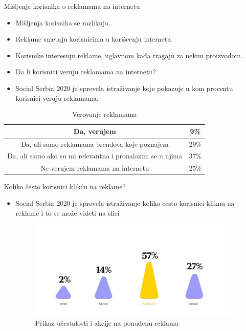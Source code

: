 \documentclass{beamer}
\begin{document}
	\begin{frame}{Mišljenje korisnika o reklamama na internetu}
		\begin{itemize}
			\item Mišljenja korisnika se razlikuju.
			\item Reklame smetaju korisnicima u korišcenju interneta.
			\item Korisnike interesuju reklame, uglavnom kada tragaju za nekim proizvodom.
			\item Da li korisnici veruju reklamama na internetu?
			\item Social Serbia 2020 je sprovela istraživanje koje pokazuje u kom procentu korisnici veruju reklamama.
		\end{itemize}
		\begin{table}[h!]
			\begin{center}
				\caption{Verovanje reklamama}
				\begin{tabular}{|c|c|} \hline
					Da, verujem&9\%\\ \hline
					Da, ali samo reklamama brendova koje poznajem&29\%\\ \hline
					Da, ali samo ako su mi relevantna i pronalazim se u njima&37\%\\ \hline
					Ne verujem reklamama na internetu&25\%\\ \hline
				\end{tabular}
				\label{tab:tabela1}
			\end{center}
		\end{table}
	\end{frame}
	
	
	\begin{frame}{Koliko često korisnici klikću na reklame?}
		
		\begin{itemize}
			\item Social Serbia 2020 je sprovela istraživanje koliko cesto korisnici kliknu na reklame i to se može videti na slici
			\begin{figure}[h!]
				\begin{center}
					\includegraphics[scale=0.40]{klik_na_reklamu.jpg}
				\end{center}
				\caption{Prikaz učestalosti i akcije na ponuđenu reklamu}
				\label{fig:klik_na_reklamu}
			\end{figure}
		\end{itemize}
		
	\end{frame}
	
\end{document}

